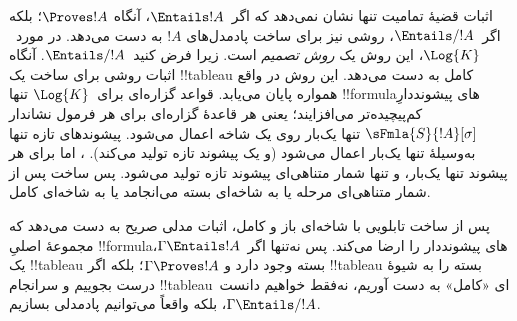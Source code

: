 \documentclass[../../../include/open-logic-section]{subfiles}
\begin{document}
      

\begin{explain}
  اثبات قضیهٔ تمامیت تنها نشان نمی‌دهد که اگر~$\Entails !A$، آنگاه
  $\Proves !A$؛ بلکه اگر~$\Entails/ !A$، روشی نیز برای ساخت پادمدل‌های
  $!A$ به دست می‌دهد. در مورد~$\Log{K}$، این روش یک \emph{روش
    تصمیم} است. زیرا فرض کنید~$\Entails/ !A$. آنگاه اثبات
   روشی برای ساخت یک !!{tableau}
  کامل به دست می‌دهد. این روش در واقع همواره پایان می‌یابد. قواعد
  گزاره‌ای برای~$\Log{K}$ تنها !!{formula}های پیشونددارِ کم‌پیچیده‌تر
  می‌افزایند؛ یعنی هر قاعدهٔ گزاره‌ای برای هر فرمول نشاندار
  $\sFmla{S}{!A}[\sigma]$ تنها یک‌بار روی یک شاخه اعمال می‌شود.
  پیشوندهای تازه تنها به‌وسیلهٔ
   تنها یک‌بار اعمال می‌شود (و یک پیشوند تازه
  تولید می‌کند).
  ، اما برای هر پیشوند تنها یک‌بار، و تنها شمار
  متناهی‌ای پیشوند تازه تولید می‌شود. پس ساخت پس از شمار متناهی‌ای
  مرحله یا به شاخه‌ای بسته می‌انجامد یا به شاخه‌ای کامل.

  پس از ساخت تابلویی با شاخه‌ای باز و کامل، اثبات
   مدلی صریح به دست می‌دهد که
  مجموعهٔ اصلیِ !!{formula}های پیشونددار را ارضا می‌کند. پس نه‌تنها
  اگر~$\Gamma \Entails !A$، یک !!{tableau} بسته وجود دارد و
  $\Gamma \Proves !A$؛ بلکه اگر !!{tableau} بسته را به شیوهٔ درست
  بجوییم و سرانجام !!{tableau}ای «کامل» به دست آوریم، نه‌فقط خواهیم
  دانست~$\Gamma \Entails/ !A$، بلکه واقعاً می‌توانیم پادمدلی بسازیم.
\end{explain}
\end{document}
